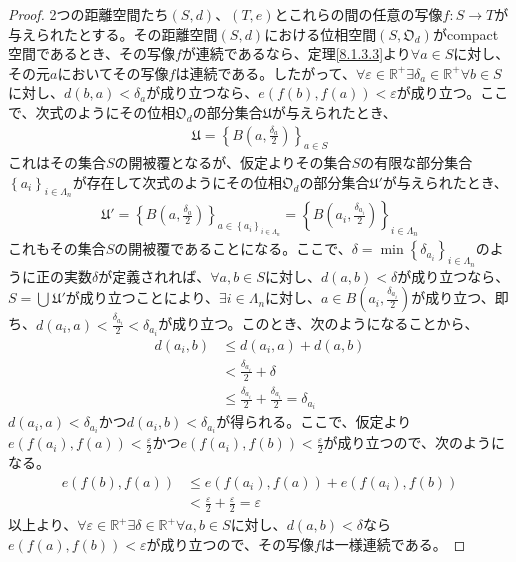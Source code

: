 \documentclass[dvipdfmx]{jsarticle}
\begin{document}
\begin{proof}
2つの距離空間たち$(S,d)$、$(T,e)$とこれらの間の任意の写像$f:S \rightarrow T$が与えられたとする。その距離空間$(S,d)$における位相空間$\left( S,\mathfrak{O}_{d} \right)$がcompact空間であるとき、その写像$f$が連続であるなら、定理\ref{8.1.3.3}より$\forall a \in S$に対し、その元$a$においてその写像$f$は連続である。したがって、$\forall\varepsilon \in \mathbb{R}^{+}\exists\delta_{a} \in \mathbb{R}^{+}\forall b \in S$に対し、$d(b,a) < \delta_{a}$が成り立つなら、$e\left( f(b),f(a) \right) < \varepsilon$が成り立つ。ここで、次式のようにその位相$\mathfrak{O}_{d}$の部分集合$\mathfrak{U}$が与えられたとき、
\begin{align*}
\mathfrak{U} = \left\{ B\left( a,\frac{\delta_{a}}{2} \right) \right\}_{a \in S}
\end{align*}
これはその集合$S$の開被覆となるが、仮定よりその集合$S$の有限な部分集合$\left\{ a_{i} \right\}_{i \in \varLambda_{n}}$が存在して次式のようにその位相$\mathfrak{O}_{d}$の部分集合$\mathfrak{U}'$が与えられたとき、
\begin{align*}
\mathfrak{U}' = \left\{ B\left( a,\frac{\delta_{a}}{2} \right) \right\}_{a \in \left\{ a_{i} \right\}_{i \in \varLambda_{n}}} = \left\{ B\left( a_{i},\frac{\delta_{a_{i}}}{2} \right) \right\}_{i \in \varLambda_{n}}
\end{align*}
これもその集合$S$の開被覆であることになる。ここで、$\delta = \min\left\{ \delta_{a_{i}} \right\}_{i \in \varLambda_{n}}$のように正の実数$\delta$が定義されれば、$\forall a,b \in S$に対し、$d(a,b) < \delta$が成り立つなら、$S = \bigcup_{} \mathfrak{U}'$が成り立つことにより、$\exists i \in \varLambda_{n}$に対し、$a \in B\left( a_{i},\frac{\delta_{a_{i}}}{2} \right)$が成り立つ、即ち、$d\left( a_{i},a \right) < \frac{\delta_{a_{i}}}{2} < \delta_{a_{i}}$が成り立つ。このとき、次のようになることから、
\begin{align*}
d\left( a_{i},b \right) &\leq d\left( a_{i},a \right) + d(a,b)\\
&< \frac{\delta_{a_{i}}}{2} + \delta\\
&\leq \frac{\delta_{a_{i}}}{2} + \frac{\delta_{a_{i}}}{2} = \delta_{a_{i}}
\end{align*}
$d\left( a_{i},a \right) < \delta_{a_{i}}$かつ$d\left( a_{i},b \right) < \delta_{a_{i}}$が得られる。ここで、仮定より$e\left( f\left( a_{i} \right),f(a) \right) < \frac{\varepsilon}{2}$かつ$e\left( f\left( a_{i} \right),f(b) \right) < \frac{\varepsilon}{2}$が成り立つので、次のようになる。
\begin{align*}
e\left( f(b),f(a) \right) &\leq e\left( f\left( a_{i} \right),f(a) \right) + e\left( f\left( a_{i} \right),f(b) \right)\\
&< \frac{\varepsilon}{2} + \frac{\varepsilon}{2} = \varepsilon
\end{align*}
以上より、$\forall\varepsilon \in \mathbb{R}^{+}\exists\delta \in \mathbb{R}^{+}\forall a,b \in S$に対し、$d(a,b) < \delta$なら$e\left( f(a),f(b) \right) < \varepsilon$が成り立つので、その写像$f$は一様連続である。
\end{proof}
\end{document}
